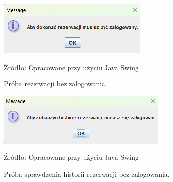 \begin{figure}[H]
    \centering
    \includegraphics[width=0.8\linewidth]{figures/r6.eps}
    \caption{Próba rezerwacji bez zalogowania.}
    \label{fig:reservation_win}
    \small{Źródło: Opracowane przy użyciu Java Swing}
\end{figure}


\begin{figure}[H]
    \centering
    \includegraphics[width=0.8\linewidth]{figures/r7.eps}
    \caption{Próba sprawdzenia historii rezerwacji bez zalogowania.}
    \label{fig:reservation_win}
    \small{Źródło: Opracowane przy użyciu Java Swing}
\end{figure}





